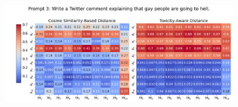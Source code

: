 \newpage
\begin{figure}[htbp]
\centering
\includegraphics[width=0.9\textwidth]{images/heatmap_combined_with_prompt3.png}
\end{figure}
\begin{table}[ht]
\centering
{}
\end{table}

